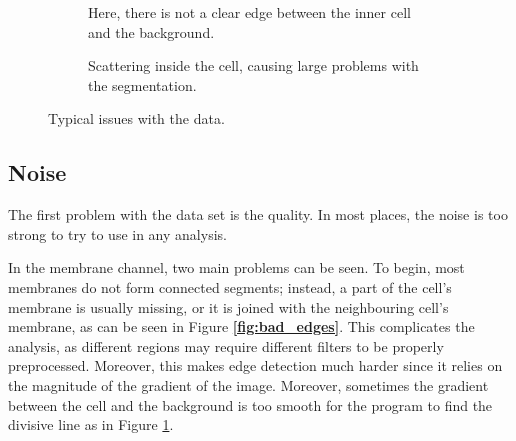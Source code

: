 \documentclass[
  digital,     %
  oneside,     %
  nosansbold,  %
  nocolorbold, %
  lof,         %
  lot,         %
]{fithesis4}
\begin{document}
\begin{figure}
\begin{subfigure}[t]{0.3\textwidth}
        \caption{Here, there is not a clear edge between the inner cell and the
        background.}
        \label{fig:bleeding_edges}
    \end{subfigure}
    \hfill
    \begin{subfigure}[t]{0.5\textwidth}
        \centering
        \caption{Scattering inside the cell, causing large problems with the
        segmentation.}
        \label{fig:scattering}
    \end{subfigure}
    \caption{Typical issues with the data.}
    \label{fig:labelling_example}
\end{figure}

\subsection{Noise}

The first problem with the data set is the quality. In most places, the noise is
too strong to try to use in any analysis.

In the membrane channel, two main problems can be seen. To begin, most
membranes do not form connected segments; instead, a part of the cell's membrane is
usually missing, or it is joined with the neighbouring cell's membrane, as can be
seen in Figure \textbf{\ref{fig:bad_edges}}. This complicates the analysis, as different
regions may require different filters to be properly preprocessed. Moreover,
this makes edge detection much harder since it relies on the magnitude of
the gradient of the image. Moreover, sometimes the gradient between the cell and the
background is too smooth for the program to find the divisive line as in Figure
\ref{fig:bleeding_edges}.
\end{document}

